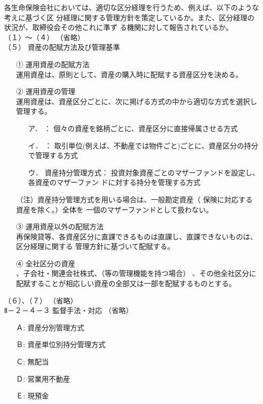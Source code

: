 \documentclass[report,gutter=10mm,fore-edge=10mm,uplatex,dvipdfmx]{jlreq}
\begin{document}
各生命保険会社においては、適切な区分経理を行うため、例えば、以下のような考えに基づく区
分経理に関する管理方針を策定しているか。また、区分経理の状況が、取締役会その他これに準ず
る機関に対して報告されているか。\\
（１）～（４） （省略）\\
（５） 資産の配賦方法及び管理基準
\begin{itemize}
\item[①] 運用資産の配賦方法\\
 運用資産は、原則として、資産の購入時に配賦する資産区分を決める。
\item[②] 運用資産の管理\\
 運用資産は、資産区分ごとに、次に掲げる方式の中から適切な方式を選択し管理する。

\begin{itemize}
\item[ ア．] ： 個々の資産を銘柄ごとに、資産区分に直接帰属させる方式
\item[ イ．] ： 取引単位(例えば、不動産では物件ごと)ごとに、資産区分の持分で管理する方式
\item[ ウ．] 資産持分管理方式： 投資対象資産ごとのマザーファンドを設定し、各資産のマザーファン
 ドに対する持分を管理する方式
\end{itemize} 
（注）資産持分管理方式を用いる場合は、一般勘定資産（ 保険に対応する資産を除く。）全体を 一個のマザーファンドとして扱わない。
\item[③] 運用資産以外の配賦方法\\
 再保険貸等、各資産区分に直課できるものは直課し、直課できないものは、区分経理に関する
 管理方針に基づいて配賦する。
\item[④] 全社区分の資産\\
 、子会社・関連会社株式、（等の管理機能を持つ場合）
 、その他全社区分に配賦することが相応しい資産の全部又は一部を配賦するものとする。
\end{itemize}
\noindent （６）、（７） （省略）\\
Ⅱ－２－４－３ 監督手法・対応 （省略）

\answer{}
\begin{itemize}
\item[ Ａ: ] 資産分別管理方式
\item[ Ｂ: ] 資産単位別持分管理方式
\item[ Ｃ: ] 無配当
\item[ Ｄ: ] 営業用不動産
\item[ Ｅ: ] 現預金
\end{itemize}
\end{document}
